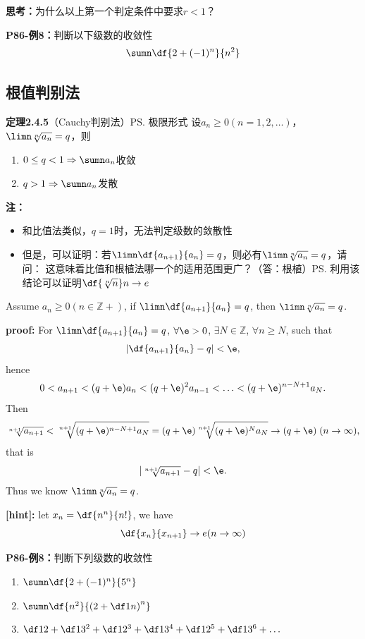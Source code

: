 {\bf 思考：}为什么以上第一个判定条件中要求$r<1$？

{\bf P86-例8：}判断以下级数的收敛性
$$\sumn\df{2+(-1)^n}{n^2}$$

\subsection{根值判别法}

{\bf 定理2.4.5}（Cauchy判别法）\ps{极限形式}
设$a_n\geq 0(n=1,2,\ldots)$，$\limn\sqrt[n]{a_n}=q$，则
\begin{enumerate}
  \setlength{\itemindent}{1cm}
  \item $0\leq q<1\Rightarrow\sumn a_n$收敛
  \item $q>1\Rightarrow\sumn a_n$发散
\end{enumerate}

{\bf 注：}
\begin{itemize}
  \setlength{\itemindent}{1cm}
  \item 和比值法类似，$q=1$时，无法判定级数的敛散性
  \item
  但是，可以证明：若$\limn\df{a_{n+1}}{a_n}=q$，则必有$\limn\sqrt[n]{a_n}=q$，请问：
  这意味着比值和根植法哪一个的适用范围更广？（答：根植）\ps{利用该结论可以证明$\df{\sqrt[n]n}n\to e$}
\end{itemize}


\begin{shaded}
Assume $a_n\geq 0(n\in\mathbb{Z}+)$, if $\limn\df{a_{n+1}}{a_n}=q$, then
$\limn\sqrt[n]{a_n}=q$.

{\bf proof:} For $\limn\df{a_{n+1}}{a_n}=q$, $\forall \e>0$, $\exists
N\in\mathbb{Z}$, $\forall n\geq N$, such that
$$\left|\df{a_{n+1}}{a_n}-q\right|<\e,$$
hence
$$0<a_{n+1}<(q+\e)a_n<(q+\e)^2a_{n-1}<\ldots<(q+\e)^{n-N+1}a_N.$$
Then
$$\sqrt[n+1]{a_{n+1}}<\sqrt[n+1]{(q+\e)^{n-N+1}a_N}=(q+\e)
\sqrt[n+1]{(q+\e)^Na_N}\to(q+\e)\;(n\to\infty),$$
that is
$$|\sqrt[n+1]{a_{n+1}}-q|<\e.$$
Thus we know $\limn\sqrt[n]{a_n}=q$.
\end{shaded}


{\bf [hint]:} let $x_n=\df{n^n}{n!}$, we have
$$\df{x_{n}}{x_{n+1}}\to e(n\to\infty)$$

{\bf P86-例8：}判断下列级数的收敛性
\begin{enumerate} [(1)]
  \setlength{\itemindent}{1cm}
  \item $\sumn\df{2+(-1)^n}{5^n}$
  \item $\sumn\df{n^2}{\left(2+\df 1n\right)^n}$
  \item $\df 12+\df 1{3^2}+\df 1{2^3}+\df 1{3^4}+\df 1{2^5}+\df 1{3^6}+\ldots$
\end{enumerate}

